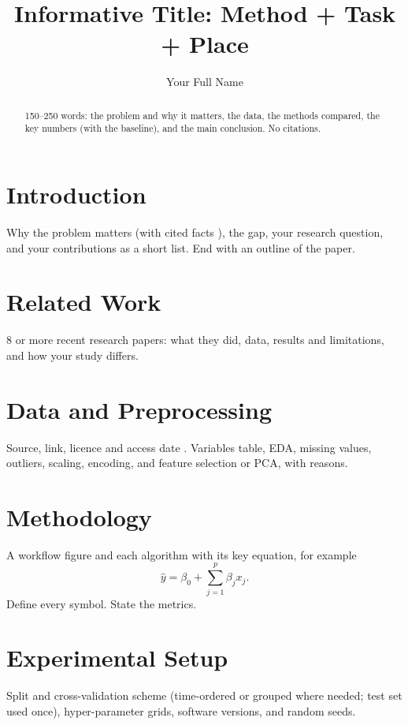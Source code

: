 \documentclass[runningheads]{llncs}
\begin{document}
\title{Informative Title: Method + Task + Place}
\author{Your Full Name}

\maketitle

\begin{abstract}
150--250 words: the problem and why it matters, the data, the methods compared,
the key numbers (with the baseline), and the main conclusion. No citations.
\end{abstract}

\section{Introduction}
Why the problem matters (with cited facts \cite{ref1}), the gap, your research question,
and your contributions as a short list. End with an outline of the paper.

\section{Related Work}
8 or more recent research papers: what they did, data, results and limitations, and how your study differs.

\section{Data and Preprocessing}
Source, link, licence and access date \cite{dataset}. Variables table, EDA, missing values,
outliers, scaling, encoding, and feature selection or PCA, with reasons.

\section{Methodology}
A workflow figure and each algorithm with its key equation, for example
\begin{equation}
  \hat{y} = \beta_0 + \sum_{j=1}^{p} \beta_j x_j .
  \label{eq:linear}
\end{equation}
Define every symbol. State the metrics.

\section{Experimental Setup}
Split and cross-validation scheme (time-ordered or grouped where needed; test set used once),
hyper-parameter grids, software versions, and random seeds.
\end{document}
